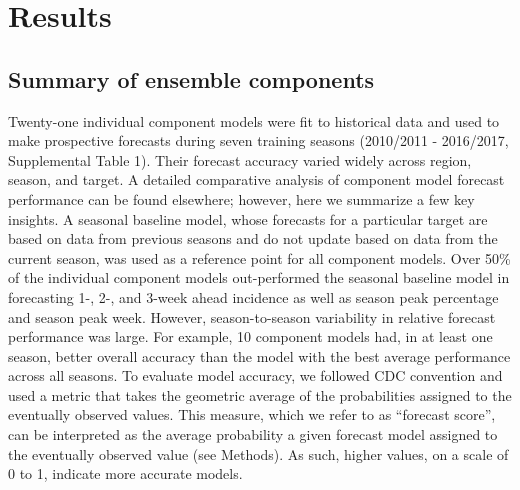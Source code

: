 \documentclass{article}\usepackage[]{graphicx}\usepackage[]{color}
\begin{document}
\section{Results}

\subsection{Summary of ensemble components} \label{subsec:comp-models}

%


Twenty-one individual component models were fit to historical data and used to make prospective forecasts during seven training seasons (2010/2011 - 2016/2017, Supplemental Table 1). 
Their forecast accuracy varied widely across region, season, and target.
A detailed comparative analysis of component model forecast performance can be found elsewhere\cite{reich2019collaborative}; however, here we summarize a few key insights.
A seasonal baseline model, whose forecasts for a particular target are based on data from previous seasons and do not update based on data from the current season, was used as a reference point for all component models.
Over 50\% of the individual component models out-performed the seasonal baseline model in forecasting 1-, 2-, and 3-week ahead incidence as well as season peak percentage and season peak week.
However, season-to-season variability in relative forecast performance was large.
For example, 10 component models had, in at least one season, better overall accuracy than the model with the best average performance across all seasons. 
To evaluate model accuracy, we followed CDC convention and used a metric that takes the geometric average of the probabilities assigned to the eventually observed values. 
This measure, which we refer to as ``forecast score'', can be interpreted as the average probability a given forecast model assigned to the eventually observed value  (see Methods).
As such, higher values, on a scale of 0 to 1, indicate more accurate models.

\end{document}

